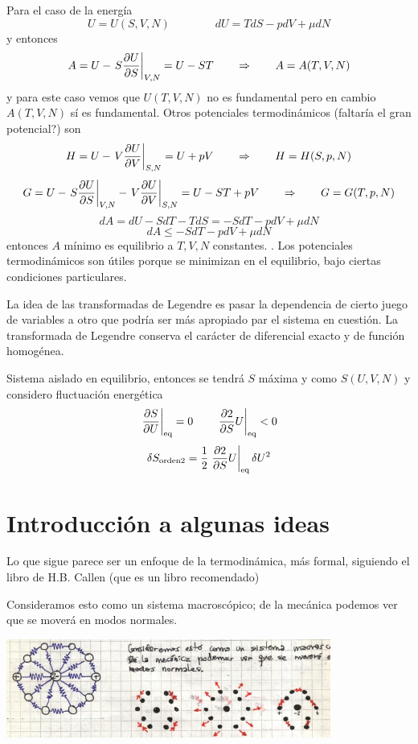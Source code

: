 \documentclass[10pt,oneside]{CBFT_book}
\begin{document}
Para el caso de la energía
\[
	U=U(S,V,N) \qquad \qquad dU = TdS - pdV + \mu dN
\]
y entonces
\[
	A = U - \left. S\frac{\partial^{\hspace{-0.05em}} {U}}{\partial {S}^{\hspace{-0.05em}}}\right|_{V,N} = U - ST \qquad \Rightarrow \qquad  A=A(T,V,N)
\]
y para este caso vemos que $U(T,V,N)$ no es fundamental pero en cambio $A(T,V,N)$ sí es fundamental.
Otros potenciales termodinámicos (faltaría el gran potencial?) son
\[
	H = U - \left. V\frac{\partial^{\hspace{-0.05em}} {U}}{\partial {V}^{\hspace{-0.05em}}}\right|_{S,N} = U + pV \qquad \Rightarrow \qquad  H=H(S,p,N)
\]
\[
	G = U - \left. S\frac{\partial^{\hspace{-0.05em}} {U}}{\partial {S}^{\hspace{-0.05em}}}\right|_{V,N} - \left. V\frac{\partial^{\hspace{-0.05em}} {U}}{\partial {V}^{\hspace{-0.05em}}}\right|_{S,N} = 
	U - ST + pV \qquad \Rightarrow \qquad  G=G(T,p,N)
\]
\[
	dA = dU - SdT - TdS = -SdT - pdV + \mu dN
\]
\[
	dA \leq -SdT - pdV + \mu dN 
\]
entonces $A$ mínimo es equilibrio a $T,V,N$ constantes.
.
Los potenciales termodinámicos son útiles porque se minimizan en el equilibrio, bajo ciertas condiciones
particulares.

La idea de las transformadas de Legendre es pasar la dependencia de cierto juego de variables a otro
que podría ser más apropiado par el sistema en cuestión. La transformada de Legendre conserva el 
carácter de diferencial exacto y de función homogénea.

Sistema aislado en equilibrio, entonces se tendrá $S$ máxima y como $S(U,V,N)$ y considero fluctuación
energética
\[
	\left. \frac{\partial^{\hspace{-0.05em}} {S}}{\partial {U}^{\hspace{-0.05em}}} \right|_{\text{eq}} = 0 \qquad \left. \frac{\partial^{\hspace{-0.05em}} {2}}{\partial {S}^{\hspace{-0.05em}}}{U} \right|_{\text{eq}} < 0
\]
\[
	\delta S_{\mathrm{orden 2}} = \frac{1}{2} \left. \frac{\partial^{\hspace{-0.05em}} {2}}{\partial {S}^{\hspace{-0.05em}}}{U} \right|_{\text{eq}} \delta U^2
\]

\section{Introducción a algunas ideas}

Lo que sigue parece ser un enfoque de la termodinámica, más formal, siguiendo el libro de H.B. Callen (que
es un libro recomendado)

Consideramos esto como un sistema macroscópico; de la mecánica podemos ver que se moverá en modos
normales.

\includegraphics[width=0.80\textwidth]{images/1606329005.jpg}
\end{document}

